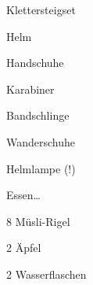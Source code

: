 \documentclass[a4paper]{scrartcl}
\begin{document}
\begin{multicols}{3}
\begin{todolist}
\begin{todolist}
        \item Klettersteigset
        \item Helm
        \item Handschuhe
        \item Karabiner
        \item Bandschlinge
        \item Wanderschuhe
        \item Helmlampe (!)
    \end{todolist}
    \item Essen\dots
    \begin{todolist}
        \item 8 Müsli-Rigel
        \item 2 Äpfel
        \item 2 Wasserflaschen
    \end{todolist}
\end{todolist}
\end{multicols}
\end{document}
